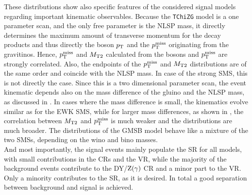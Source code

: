 These distributions show also specific features of the considered signal models regarding important kinematic observables. Because the \texttt{TChiZG} model is a one parameter scan, and the only free parameter is the NLSP mass, it directly determines the maximum amount of transverse momentum for the decay products and thus directly the boson $p_{\mathrm{T}}$ and the $p_{\mathrm{T}}^\text{miss}$ originating from the gravitinos. Hence, $p_{\mathrm{T}}^\text{miss}$ and $M_{\mathrm{T2}}$ calculated from the bosons and $p_{\mathrm{T}}^\text{miss}$ are strongly correlated. Also, the endpoints of the $p_{\mathrm{T}}^\text{miss}$ and $M_{\mathrm{T2}}$ distributions are of the same order and coincide with the NLSP mass. In case of the strong SMS, this is not directly the case. Since this is a two dimensional parameter scan, the event kinematic depends also on the mass difference of the gluino and the NLSP mass, as discussed in . In cases where the mass difference is small, the kinematics evolve similar as for the EWK SMS, while for larger mass differences, as shown in , the correlation between $M_{\mathrm{T2}}$ and $p_{\mathrm{T}}^\text{miss}$ is much weaker and the distributions are much broader. The distributions of the GMSB model behave like a mixture of the two SMSs, depending on the wino and bino masses.\\
And most importantly, the signal events mainly populate the SR for all models, with small contributions in the CRs and the VR, while the majority of the background events contribute to the DY/$\mathrm{Z}(\gamma)$ CR and a minor part to the VR. Only a minority contributes to the SR, as it is desired. In total a good separation between background and signal is achieved.

